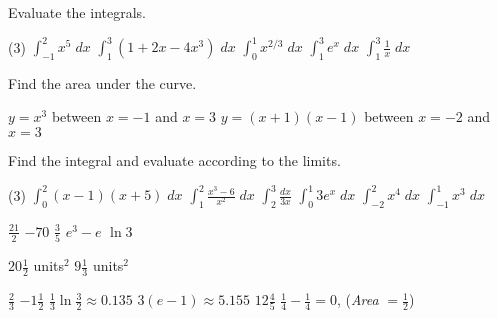 \begin{Exercise}[title={Area},label=exArea]
	\Question Evaluate the integrals. 
	\begin{tasks}(3)
		\task $\int_{ -1}^{2}x^{5}\; d x$ %
		\task $\int_{1}^{3}\left (1 +2 x -4 x^{3}\right )\; d x$ %
		\task $\int_{0}^{1}x^{2/3}\; d x$ %
		\task $\int_{1}^{3}e^{x}\; d x$ %
		\task $\int_{1}^{3}\frac{1}{x}\; d x$ %
	\end{tasks}
	
	\Question Find the area under the curve.
	\begin{tasks}
		\task $y =x^{3}$ between $x = -1$ and $x =3$ %
		\task $y =\left (x +1\right ) \left (x -1\right )$ between $x = -2$ and $x =3$ %
	\end{tasks}
	
	\Question Find the integral and evaluate according to the limits.
	\begin{tasks}(3)
		\task $\int _{0}^{2}\left (x -1\right ) \left (x +5\right )\; d x$ %
		\task $\int _{1}^{2}\frac{x^{3} -6}{x^{2}}\; d x$  %
		\task $\int _{2}^{3}\frac{d x}{3 x}$ %
		\task $\int _{0}^{1}3 e^{x}\; d x$ %
		\task $\int _{ -2}^{2}x^{4}\; d x$  %
		\task $\int _{ -1}^{1}x^{3}\; d x$ %
	\end{tasks}
\end{Exercise}
\begin{Answer}[ref={exArea}]
	\Question %
\begin{tasks}
	\task $\frac{21}{2}$ 
	\task $ -70$ 
	\task $\frac{3}{5}$ 
	\task $e^{3} -e$ 
	\task $\ln  3$ 
\end{tasks}

\Question %
\begin{tasks}
	\task $20\frac{1}{2}$ units$^2$
	\task $9\frac{1}{3}$ units$^2$
\end{tasks}

\Question %
\begin{tasks}
	\task $\frac{2}{3}$
	\task $ -1\frac{1}{2}$ 
	\task $\frac{1}{3} \ln  \frac{3}{2} \approx 0.135$
	\task $3 \left (e -1\right ) \approx 5.155$
	\task $12\frac{4}{5}$ 
	\task $\frac{1}{4} -\frac{1}{4} =0$, (\textit{Area} $ =\frac{1}{2}$)
\end{tasks}
\end{Answer}%

